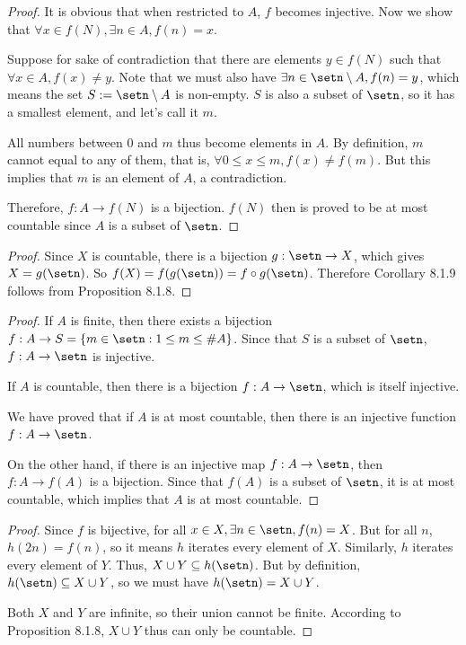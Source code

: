 \begin{proof}
It is obvious that when restricted to $A$, $f$ becomes injective. Now we show that $\forall x \in f(N), \exists n \in A, f(n) = x$. 

Suppose for sake of contradiction that there are elements $y \in f(N)$ such that $\forall x \in A, f(x) \ne y$. Note that we must also have $\exists n \in \setn \setminus A, f(n) = y$, which means the set $S := \setn \setminus A$ is non-empty. $S$ is also a subset of $\setn$, so it has a smallest element, and let's call it $m$. 

All numbers between 0 and $m$ thus become elements in $A$. By definition, $m$ cannot equal to any of them, that is, $\forall 0\le x \le m, f(x) \ne f(m)$. But this implies that $m$ is an element of $A$, a contradiction.

Therefore, $f: A \to f(N)$ is a bijection. $f(N)$ then is proved to be at most countable since $A$ is a subset of $\setn$.
\end{proof}

\begin{proof}
Since $X$ is countable, there is a bijection $g: \setn \to X$, which gives $X = g(\setn)$. So $f(X) = f(g(\setn)) = f \circ g (\setn)$. Therefore Corollary 8.1.9 follows from Proposition 8.1.8.
\end{proof}

\begin{proof}
If $A$ is finite, then there exists a bijection $f: A \to S = \{m\in \setn : 1 \le m \le \#A\}$. Since that $S$ is a subset of $\setn$, $f:A \to \setn$ is injective.

If $A$ is countable, then there is a bijection $f: A \to \setn$, which is itself injective.

We have proved that if $A$ is at most countable, then there is an injective function $f: A \to \setn$. 

On the other hand, if there is an injective map $f: A \to \setn$, then $f: A \to f(A)$ is a bijection. Since that $f(A)$ is a subset of $\setn$, it is at most countable, which implies that $A$ is at most countable.
\end{proof}

\begin{proof}
Since $f$ is bijective, for all $x \in X, \exists n \in \setn, f(n) = X$. But for all $n$, $h(2n) = f(n)$, so it means $h$ iterates every element of $X$. Similarly, $h$ iterates every element of $Y$. Thus, $X\cup Y \subseteq h(\setn)$. But by definition, $h(\setn) \subseteq X \cup Y$, so we must have $h(\setn) = X \cup Y$.

Both $X$ and $Y$ are infinite, so their union cannot be finite. According to Proposition 8.1.8, $X\cup Y$ thus can only be countable.
\end{proof}

